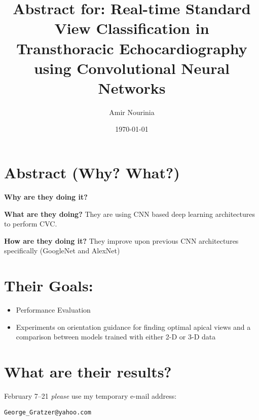 \documentclass[]{amsart}
\begin{document}
\title{Abstract for: Real-time Standard View Classification in Transthoracic Echocardiography using 
Convolutional Neural Networks}
\author{Amir Nourinia}
\date{\today}
\maketitle

\section*{Abstract (Why? What?)}

\textbf{Why are they doing it?}

\textbf{What are they doing?}
They are using CNN based deep learning architectures to perform CVC.

\textbf{How are they doing it?}
They improve upon previous CNN architectures specifically (GoogleNet and AlexNet)

\section*{Their Goals:}
  \begin{itemize}
    \item Performance Evaluation
    \item Experiments on orientation guidance for finding optimal apical views 
    and a comparison between models trained with either 2-D or 3-D data
  \end{itemize}

\section*{What are their results?}

  February 7--21 \emph{please} use my
  temporary e-mail address:
  \begin{center}
  \texttt{George\_Gratzer@yahoo.com}
    \end{center}
\end{document}
